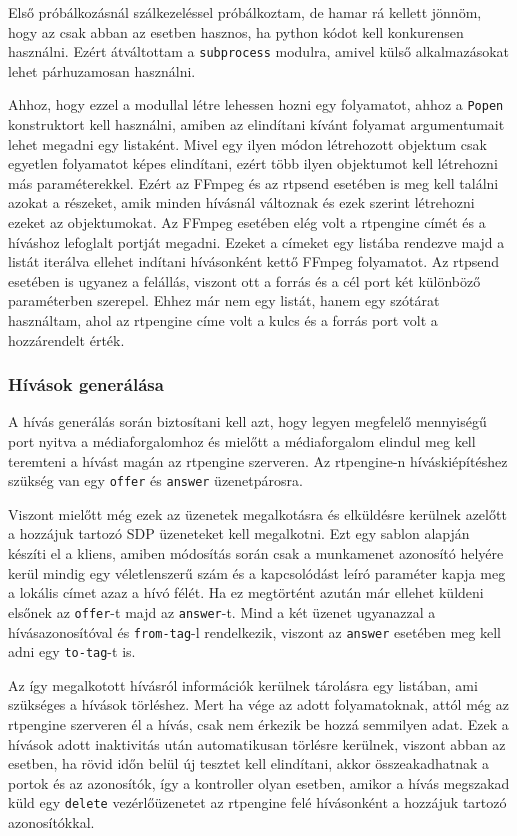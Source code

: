 Első próbálkozásnál szálkezeléssel próbálkoztam, de hamar rá kellett jönnöm,
hogy az csak abban az esetben hasznos, ha python kódot kell konkurensen 
használni. Ezért átváltottam a \texttt{subprocess} \cite{subprocess} modulra, amivel külső alkalmazásokat lehet párhuzamosan használni.

Ahhoz, hogy ezzel a modullal létre lehessen hozni egy folyamatot, ahhoz a \texttt{Popen}
konstruktort kell használni, amiben az elindítani kívánt folyamat argumentumait lehet
megadni egy listaként. Mivel egy ilyen módon létrehozott objektum csak egyetlen 
folyamatot képes elindítani, ezért több ilyen objektumot kell létrehozni más 
paraméterekkel. Ezért az FFmpeg és az rtpsend esetében is meg kell találni azokat a 
részeket, amik minden hívásnál változnak és ezek szerint létrehozni ezeket az 
objektumokat. Az FFmpeg esetében elég volt a rtpengine címét és a híváshoz lefoglalt 
portját megadni. Ezeket a címeket egy listába rendezve majd a listát iterálva ellehet 
indítani hívásonként kettő FFmpeg folyamatot. Az rtpsend esetében is ugyanez a felállás, 
viszont ott a forrás és a cél port két különböző paraméterben szerepel. Ehhez már nem egy 
listát, hanem egy szótárat használtam, ahol az rtpengine címe volt a kulcs és a forrás 
port volt a hozzárendelt érték.

\subsubsection{Hívások generálása}

A hívás generálás során biztosítani kell azt, hogy legyen megfelelő mennyiségű port
nyitva a médiaforgalomhoz és mielőtt a médiaforgalom elindul meg kell teremteni a hívást
magán az rtpengine szerveren. Az rtpengine-n híváskiépítéshez szükség van egy 
\texttt{offer} és \texttt{answer} üzenetpárosra.

Viszont mielőtt még ezek az üzenetek megalkotásra és elküldésre kerülnek azelőtt
a hozzájuk tartozó SDP üzeneteket kell megalkotni. Ezt egy sablon alapján készíti el 
a kliens, amiben módosítás során csak a munkamenet azonosító helyére kerül
mindig egy véletlenszerű szám és a kapcsolódást leíró paraméter kapja meg a lokális 
címet azaz a hívó félét. Ha ez megtörtént azután már ellehet küldeni elsőnek az 
\texttt{offer}-t majd az \texttt{answer}-t. Mind a két üzenet ugyanazzal a 
hívásazonosítóval és \texttt{from-tag}-l rendelkezik, viszont az \texttt{answer} 
esetében meg kell adni egy \texttt{to-tag}-t is.

Az így megalkotott hívásról információk kerülnek tárolásra egy listában, ami szükséges
a hívások törléshez. Mert ha vége az adott folyamatoknak, attól még az rtpengine szerveren
él a hívás, csak nem érkezik be hozzá semmilyen adat. Ezek a hívások adott inaktivitás után automatikusan törlésre kerülnek, viszont abban az esetben, ha rövid időn 
belül új tesztet kell elindítani, akkor összeakadhatnak a portok és az azonosítók, így a 
kontroller olyan esetben, amikor a hívás megszakad küld egy \texttt{delete} 
vezérlőüzenetet az rtpengine felé hívásonként a hozzájuk tartozó azonosítókkal.

